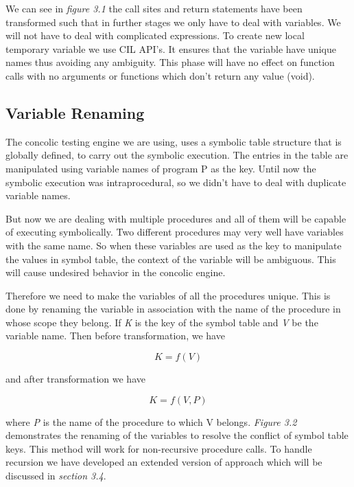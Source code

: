 \documentclass[12pt,oneside]{book}
\begin{document}
We can see in \textit{figure 3.1} the call sites and return statements have been transformed such that in further stages we only have to deal with variables. We will not have to deal with complicated expressions. To create new local temporary variable we use CIL API's. It ensures that the variable have unique names thus avoiding any ambiguity.
This phase will have no effect on function calls with no arguments or functions which don't return any value (void).
\newpage

\subsection{Variable Renaming}
The concolic testing engine we are using, uses a symbolic table structure that is globally defined, to carry out the symbolic execution. The entries in the table are manipulated using variable names of program P as the key. Until now the symbolic execution was intraprocedural, so we didn't have to deal with duplicate variable names.

But now we are dealing with multiple procedures and all of them will be capable of executing symbolically. Two different procedures may very well have variables with the same name. So when these variables are used as the key to manipulate the values in symbol table, the context of the variable will be ambiguous. This will cause undesired behavior in the concolic engine. 

Therefore we need to make the variables of all the procedures unique. This is done by renaming the variable in association with the name of the procedure in whose scope they belong. If \textit{K} is the key of the symbol table and \textit{V} be the variable name. Then before transformation, we have 

\begin{equation}
K = f(V)
\end{equation}

and after transformation we have

\begin{equation}
K = f(V,P)
\end{equation}

where \textit{P} is the name of the procedure to which V belongs. \textit{Figure 3.2} demonstrates the renaming of the variables to resolve the conflict of symbol table keys. This method will work for non-recursive procedure calls. To handle recursion we have developed an extended version of approach which will be discussed in \textit{section 3.4}.\\
\end{document}
